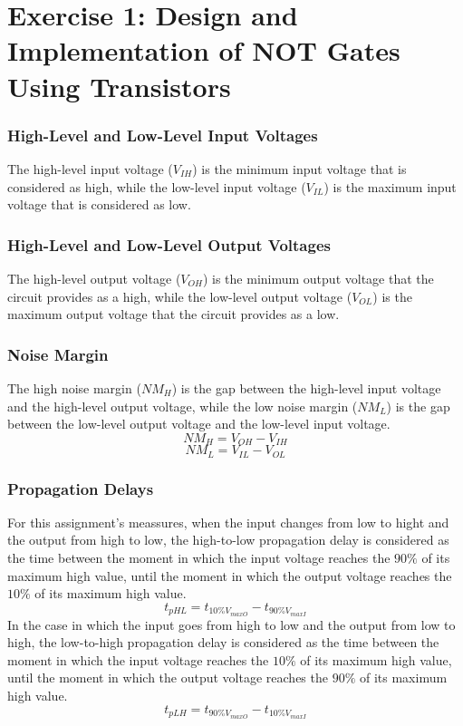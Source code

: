 \documentclass[a4paper,11pt]{report}
\begin{document}
\section{\color{olive}Exercise 1: Design and Implementation of NOT Gates Using Transistors} %


\subsubsection{\color{red}High-Level and Low-Level Input Voltages}
The high-level input voltage ($V_{IH}$) is the minimum input voltage that is considered as high, while the low-level input voltage ($V_{IL}$)  is the maximum input voltage that is considered as low.

\subsubsection{\color{red}High-Level and Low-Level Output Voltages}
The high-level output voltage ($V_{OH}$) is the minimum output voltage that the circuit provides as a high, while the low-level output voltage ($V_{OL}$) is the maximum output voltage that the circuit provides as a low.

\subsubsection{\color{red}Noise Margin}
The high noise margin ($NM_{H}$) is the gap between the high-level input voltage and the high-level output voltage, while the low noise margin ($NM_{L}$) is the gap between the low-level output voltage and the low-level input voltage.
$$NM_{H} = V_{OH} - V_{IH}$$
$$NM_{L} = V_{IL} - V_{OL}$$

\subsubsection{\color{red}Propagation Delays}
For this assignment's meassures, when the input changes from low to hight and the output from high to low, the high-to-low propagation delay is considered as the time between the moment in which the input voltage reaches the $90\% $ of its maximum high value, until the moment in which the output voltage reaches the $10\%$ of its maximum high value.
$$t_{pHL} = t_{10\%V_{maxO}} - t_{90\%V_{maxI}}$$
In the case in which the input goes from high to low and the output from low to high, the low-to-high propagation delay is considered as the time between the moment in which the input voltage reaches the $10\%$ of its maximum high value, until the moment in which the output voltage reaches the $90\%$ of its maximum high value.
$$t_{pLH} = t_{90\%V_{maxO}} - t_{10\%V_{maxI}}$$
\end{document}

